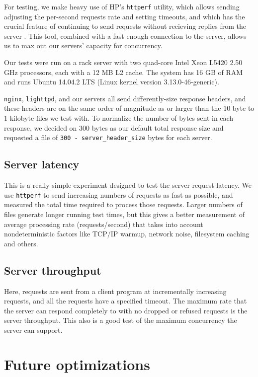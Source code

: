 \documentclass[twoside]{article}
\begin{document}
\begin{multicols}{2}
For testing, we make heavy use of HP's \verb+httperf+ utility, which
allows sending adjusting the per-second requests rate and setting
timeouts, and which has the crucial feature of continuing to send
requests without recieving replies from the server
\cite{mosberger1998httperf}. This tool, combined with a fast enough
connection to the server, allows us to max out our servers' capacity
for concurrency.

Our tests were run on a rack server with two quad-core Intel Xeon
L5420 2.50 GHz processors, each with a 12 MB L2 cache. The system has
16 GB of RAM and runs Ubuntu 14.04.2 LTS (Linux kernel version
3.13.0-46-generic).

\verb+nginx+, \verb+lighttpd+, and our servers all send
differently-size response headers, and these headers are on the same
order of magnitude as or larger than the 10 byte to 1 kilobyte files
we test with. To normalize the number of bytes sent in each response,
we decided on 300 bytes as our default total response size and
requested a file of \verb+300 - server_header_size+ bytes for each
server.

\subsection{Server latency}

This is a really simple experiment designed to test the server request
latency. We use \verb+httperf+ to send increasing numbers of requests
as fast as possible, and measured the total time required to process
those requests. Larger numbers of files generate longer running test
times, but this gives a better measurement of average processing rate
(requests/second) that takes into account nondeterministic factors
like TCP/IP warmup, network noise, filesystem caching and others.

\subsection{Server throughput}

Here, requests are sent from a client program at incrementally
increasing requests, and all the requests have a specified
timeout. The maximum rate that the server can respond completely to
with no dropped or refused requests is the server throughput. This
also is a good test of the maximum concurrency the server can support.

\section{Future optimizations}


\end{multicols}
\end{document}
